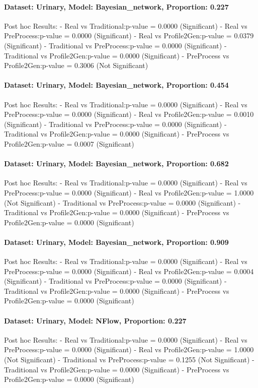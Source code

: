 \documentclass{article}
\theoremstyle{plain}
\theoremstyle{definition}
\theoremstyle{remark}
\begin{document}
\paragraph{Dataset: Urinary, Model: Bayesian\_network, Proportion: 0.227
}Post hoc Results:
- Real vs Traditional:p-value = 0.0000 (Significant)
- Real vs PreProcess:p-value = 0.0000 (Significant)
- Real vs Profile2Gen:p-value = 0.0379 (Significant)
- Traditional vs PreProcess:p-value = 0.0000 (Significant)
- Traditional vs Profile2Gen:p-value = 0.0000 (Significant)
- PreProcess vs Profile2Gen:p-value = 0.3006 (Not Significant)

\paragraph{Dataset: Urinary, Model: Bayesian\_network, Proportion: 0.454
}Post hoc Results:
- Real vs Traditional:p-value = 0.0000 (Significant)
- Real vs PreProcess:p-value = 0.0000 (Significant)
- Real vs Profile2Gen:p-value = 0.0010 (Significant)
- Traditional vs PreProcess:p-value = 0.0000 (Significant)
- Traditional vs Profile2Gen:p-value = 0.0000 (Significant)
- PreProcess vs Profile2Gen:p-value = 0.0007 (Significant)

\paragraph{Dataset: Urinary, Model: Bayesian\_network, Proportion: 0.682
}Post hoc Results:
- Real vs Traditional:p-value = 0.0000 (Significant)
- Real vs PreProcess:p-value = 0.0000 (Significant)
- Real vs Profile2Gen:p-value = 1.0000 (Not Significant)
- Traditional vs PreProcess:p-value = 0.0000 (Significant)
- Traditional vs Profile2Gen:p-value = 0.0000 (Significant)
- PreProcess vs Profile2Gen:p-value = 0.0000 (Significant)

\paragraph{Dataset: Urinary, Model: Bayesian\_network, Proportion: 0.909
}Post hoc Results:
- Real vs Traditional:p-value = 0.0000 (Significant)
- Real vs PreProcess:p-value = 0.0000 (Significant)
- Real vs Profile2Gen:p-value = 0.0004 (Significant)
- Traditional vs PreProcess:p-value = 0.0000 (Significant)
- Traditional vs Profile2Gen:p-value = 0.0000 (Significant)
- PreProcess vs Profile2Gen:p-value = 0.0000 (Significant)

\paragraph{Dataset: Urinary, Model: NFlow, Proportion: 0.227
}Post hoc Results:
- Real vs Traditional:p-value = 0.0000 (Significant)
- Real vs PreProcess:p-value = 0.0000 (Significant)
- Real vs Profile2Gen:p-value = 1.0000 (Not Significant)
- Traditional vs PreProcess:p-value = 0.1255 (Not Significant)
- Traditional vs Profile2Gen:p-value = 0.0000 (Significant)
- PreProcess vs Profile2Gen:p-value = 0.0000 (Significant)
\end{document}
